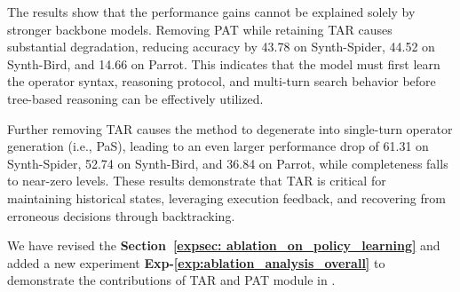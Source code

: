 The results show that the performance gains cannot be explained solely by stronger backbone models. Removing PAT while retaining TAR causes substantial degradation, reducing accuracy by 43.78 on Synth-Spider, 44.52 on Synth-Bird, and 14.66 on Parrot. This indicates that the model must first learn the operator syntax, reasoning protocol, and multi-turn search behavior before tree-based reasoning can be effectively utilized.

Further removing TAR causes the method to degenerate into single-turn operator generation (i.e., PaS), leading to an even larger performance drop of 61.31 on Synth-Spider, 52.74 on Synth-Bird, and 36.84 on Parrot, while completeness falls to near-zero levels. These results demonstrate that TAR is critical for maintaining historical states, leveraging execution feedback, and recovering from erroneous decisions through backtracking.

{We have revised the \textbf{Section~\ref{expsec: ablation_on_policy_learning}} and added a new experiment \textbf{Exp-\ref{exp:ablation_analysis_overall}} to demonstrate the contributions of TAR and PAT module in \sys.}

%
%

